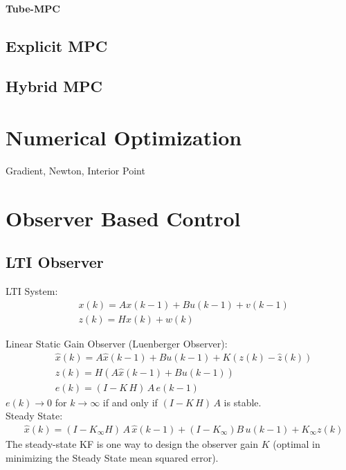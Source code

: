 \documentclass[landscape,a4paper,8pt]{scrartcl}
\begin{document}
\begin{multicols*}{3}
\paragraph{Tube-MPC}

\subsection{Explicit MPC}

\subsection{Hybrid MPC}

\section{Numerical Optimization}
Gradient, Newton, Interior Point


\section{Observer Based Control}
\subsection{LTI Observer}
LTI System: 
\begin{align*}
& x(k) = A x(k-1) + B u (k-1) + v(k-1) \\
& z(k) = H x(k) + w(k)
\end{align*}

Linear Static Gain Observer (Luenberger Observer):
\begin{align*}
&\hat{x}(k) = A \hat{x}(k-1) + B u (k-1) + K(z(k) - \hat{z}(k)) \\
&\hat{z}(k) = H ( A \hat{x}(k-1) + B u(k-1)) \\
&e(k)= (I-K \, H)\, A \,  e(k-1)
\end{align*}
$e(k) \to 0$ for $k \to \infty$ if and only if $(I-K \, H)\, A$ is stable.\\

Steady State: 
\begin{align*}
&\hat{x}(k) = (I-K_\infty H )\, A\, \hat{x}(k-1) + (I-K_\infty) B \, u(k-1) + K_\infty z(k)
\end{align*}
The steady-state KF is one way to design the observer gain $K$ (optimal in minimizing the Steady State mean squared error). \\





\end{multicols*}
\end{document}
